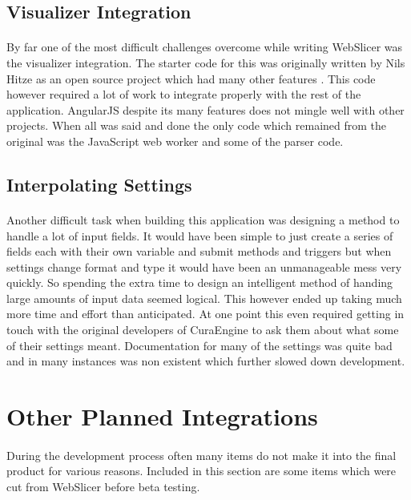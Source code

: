 \subsection{Visualizer Integration}
\paragraph{}
By far one of the most difficult challenges overcome while writing WebSlicer was the visualizer integration.
The starter code for this was originally written by Nils Hitze as an open source project which had many other features \citet{hitzeViewer-2015}.
This code however required a lot of work to integrate properly with the rest of the application.
AngularJS despite its many features does not mingle well with other projects.
When all was said and done the only code which remained from the original was the JavaScript web worker and some of the parser code.

\subsection{Interpolating Settings}
\paragraph{}
Another difficult task when building this application was designing a method to handle a lot of input fields.
It would have been simple to just create a series of fields each with their own variable and submit methods and triggers but when settings change format and type it would have been an unmanageable mess very quickly.
So spending the extra time to design an intelligent method of handing large amounts of input data seemed logical.
This however ended up taking much more time and effort than anticipated.
At one point this even required getting in touch with the original developers of CuraEngine to ask them about what some of their settings meant.
Documentation for many of the settings was quite bad and in many instances was non existent which further slowed down development.

\section{Other Planned Integrations}
\paragraph{}
During the development process often many items do not make it into the final product for various reasons.
Included in this section are some items which were cut from WebSlicer before beta testing.

